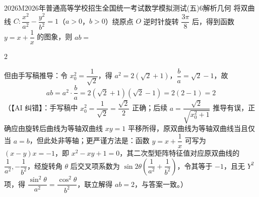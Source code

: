 
\begin{problem}{2026}{M}{2026年普通高等学校招生全国统一考试数学模拟测试(五)}{6}{解析几何}
将双曲线 $ C\colon\dfrac{x^{2}}{a^{2}}-\dfrac{y^{2}}{b^{2}}=1 $（$ a>0 $，$ b>0 $）绕原点 $ O $ 逆时针旋转 $ \dfrac{3\pi}{8} $ 后，得到函数 $ y=x+\dfrac{1}{x} $ 的图象，则 $ ab= $
\begin{choices}
\end{choices}
\end{problem}

\begin{answer}
$2$
\end{answer}

\begin{solutions}


但由手写稿推导：令 $ x_{0}^{2} = \dfrac{1}{\sqrt{2}} $，得 $ a^{2} = 2(\sqrt{2}+1) $，$ \dfrac{b}{a} = \sqrt{2}-1 $，故
$$
ab = a^{2}\cdot\dfrac{b}{a} = 2(\sqrt{2}+1)(\sqrt{2}-1) = 2(2-1) = 2
$$
（【AI 纠错】：手写稿中 $ x_{0}^{2} = \dfrac{1}{\sqrt{2}} = \dfrac{\sqrt{2}}{2} $ 正确；后续 $ a = \dfrac{\sqrt{2}}{\sqrt{x_{0}^{2}+1}} $ 推导有误，正确应由旋转后曲线为等轴双曲线 $ xy = 1 $ 平移所得，原双曲线为等轴双曲线当且仅当 $ a = b $，但此处非等轴；更严谨方法是：函数 $ y = x + \dfrac{1}{x} $ 可写为 $ (x-y)x = -1 $，即 $ x^{2} - xy + 1 = 0 $，其二次型矩阵特征值对应原双曲线的 $ \dfrac{1}{a^{2}}, -\dfrac{1}{b^{2}} $，经旋转角 $ \theta $ 后交叉项系数为 $ \sin 2\theta\left(\dfrac{1}{a^{2}} + \dfrac{1}{b^{2}}\right) $，令其等于 $ -1 $，且无 $ Y^{2} $ 项，得 $ \dfrac{\sin^{2}\theta}{a^{2}} = \dfrac{\cos^{2}\theta}{b^{2}} $，联立解得 $ ab = 2 $，与答案一致。）
\end{solutions}
